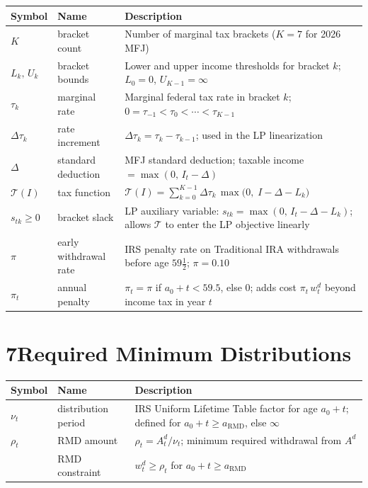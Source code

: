 \documentclass[12pt]{article}
\begin{document}
\medskip
\begin{tabular}{@{} L{2.6cm} L{4.4cm} L{6.5cm} @{}}
\toprule
\textbf{Symbol} & \textbf{Name} & \textbf{Description} \\
\midrule
$K$ & bracket count & Number of marginal tax brackets ($K = 7$ for 2026 MFJ) \\[3pt]
$L_k,\,U_k$ & bracket bounds & Lower and upper income thresholds for bracket $k$;
              $L_0 = 0$, $U_{K-1} = \infty$ \\[3pt]
$\tau_k$ & marginal rate & Marginal federal tax rate in bracket $k$;
           $0 = \tau_{-1} < \tau_0 < \cdots < \tau_{K-1}$ \\[3pt]
$\Delta\tau_k$ & rate increment & $\Delta\tau_k = \tau_k - \tau_{k-1}$;
                used in the LP linearization \\[3pt]
$\Delta$ & standard deduction & MFJ standard deduction; taxable income $= \max(0,\,I_t - \Delta)$ \\[3pt]
$\mathcal{T}(I)$ & tax function & $\mathcal{T}(I) = \sum_{k=0}^{K-1}
                  \Delta\tau_k\,\max\!\bigl(0,\;I - \Delta - L_k\bigr)$ \\[3pt]
$s_{tk} \geq 0$ & bracket slack & LP auxiliary variable: $s_{tk} = \max(0,\,I_t - \Delta - L_k)$;
                 allows $\mathcal{T}$ to enter the LP objective linearly \\[3pt]
$\pi$ & early withdrawal rate & IRS penalty rate on Traditional IRA withdrawals
        before age $59\tfrac{1}{2}$;\; $\pi = 0.10$ \\[3pt]
$\pi_t$ & annual penalty & $\pi_t = \pi$ if $a_0+t < 59.5$, else $0$;\quad
          adds cost $\pi_t\,w^d_t$ beyond income tax in year $t$ \\
\bottomrule
\end{tabular}

\section*{7\quad Required Minimum Distributions}

\begin{tabular}{@{} L{2.6cm} L{4.4cm} L{6.5cm} @{}}
\toprule
\textbf{Symbol} & \textbf{Name} & \textbf{Description} \\
\midrule
$\nu_t$ & distribution period & IRS Uniform Lifetime Table factor for age $a_0 + t$;
          defined for $a_0 + t \geq a_{\mathrm{RMD}}$, else $\infty$ \\[3pt]
$\rho_t$ & RMD amount & $\rho_t = A^d_t / \nu_t$; minimum required withdrawal from
           $A^d$ \\[3pt]
& RMD constraint & $w^d_t \geq \rho_t$ \quad for $a_0 + t \geq a_{\mathrm{RMD}}$ \\
\bottomrule
\end{tabular}
\end{document}

